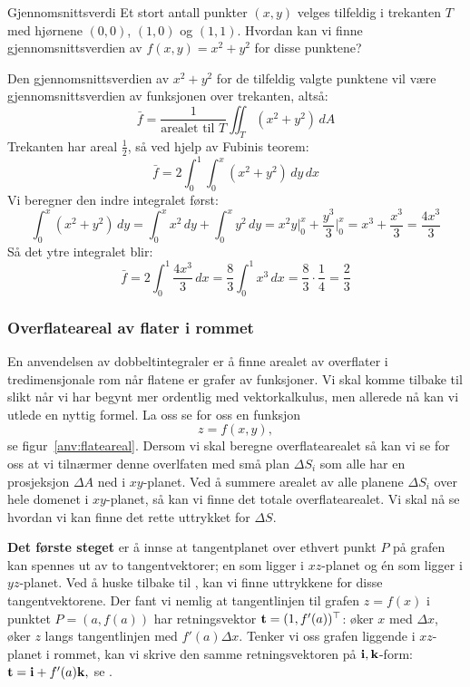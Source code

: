 \begin{eks}{Gjennomsnittsverdi}
Et stort antall punkter \( (x, y) \) velges tilfeldig i trekanten \( T \) med hjørnene \( (0,0) \), \( (1,0) \) og \( (1,1) \). Hvordan kan vi finne gjennomsnittsverdien av \( f(x,y)= x^2 + y^2 \) for disse punktene?

Den gjennomsnittsverdien av \( x^2 + y^2 \) for de tilfeldig valgte punktene vil være gjennomsnittsverdien av funksjonen over trekanten, altså:
\[
\bar{f} = \frac{1}{\text{arealet til } T} \iint_T (x^2 + y^2)\, dA
\]
Trekanten har areal \( \frac{1}{2} \), så ved hjelp av Fubinis teorem:
\[
\bar{f} = 2 \int_0^1 \int_0^x (x^2 + y^2)\, dy\, dx
\]
Vi beregner den indre integralet først:
\[
\int_0^x (x^2 + y^2)\, dy = \int_0^x x^2\, dy + \int_0^x y^2\, dy = x^2 y \big|_0^x + \frac{y^3}{3} \big|_0^x = x^3 + \frac{x^3}{3} = \frac{4x^3}{3}
\]
Så det ytre integralet blir:
\[
\bar{f} = 2 \int_0^1 \frac{4x^3}{3}\, dx = \frac{8}{3} \int_0^1 x^3\, dx = \frac{8}{3} \cdot \frac{1}{4} = \frac{2}{3}
\]
\end{eks}

\subsubsection*{Overflateareal av flater i rommet}
En anvendelsen av dobbeltintegraler er å finne arealet av overflater i tredimensjonale rom når flatene er grafer av funksjoner. Vi skal komme tilbake til slikt når vi har begynt mer ordentlig med vektorkalkulus, men allerede nå kan vi utlede en nyttig formel. La oss se for oss en funksjon 
\[z=f(x,y),\]
se figur~\ref{anv:flateareal}. Dersom vi skal beregne overflatearealet så kan vi se for oss at vi tilnærmer denne overlfaten med små plan $\Delta S_i$ som alle har en prosjeksjon $\Delta A$ ned i $xy$-planet. Ved å summere arealet av alle planene $\Delta S_i$ over hele domenet i $xy$-planet, så kan vi finne det totale overflatearealet. Vi skal nå se hvordan vi kan finne det rette uttrykket for $\Delta S$.

\textbf{Det første steget} er å innse at tangentplanet over ethvert punkt $P$ på grafen kan spennes ut av to tangentvektorer; en som ligger i $xz$-planet og én som ligger i $yz$-planet. Ved å huske tilbake til , kan vi finne uttrykkene for disse tangentvektorene. Der fant vi nemlig at tangentlinjen til grafen $z=f(x)$ i punktet $P=(a,f(a))$ har retningsvektor $\mathbf{t}=(1,f'(a))^\top$: øker $x$ med $\Delta x$, øker $z$ langs tangentlinjen med $f'(a)\Delta x$. Tenker vi oss grafen liggende i $xz$-planet i rommet, kan vi skrive den samme retningsvektoren på $\mathbf{i},\mathbf{k}$-form:
\(
\mathbf{t} = \mathbf{i} + f'(a)\mathbf{k},
\)
se .

